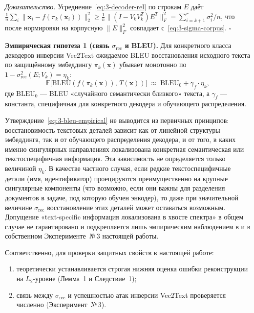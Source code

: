 \documentclass[a4paper, 12pt, oneside, openany]{article}
\begin{document}
\emph{Доказательство.} Усреднение~\eqref{eq:3-decoder-rel} по строкам $E$ даёт $\frac{1}{n} \sum_i \| \mathbf{x}_i - f(\pi_k(\mathbf{x}_i)) \|_{2}^{2} \geq \frac{1}{n}\| (I - V_k V_k^{T}) E^{T}\|_F^2 = \sum_{i = k+1}^{r} \sigma_i^{2} / n$, что после нормировки на корпусную $\| E \|_F^2$ совпадает с~\eqref{eq:3-sigma-corpus}. $\square$

\textbf{Эмпирическая гипотеза 1 (связь $\sigma_{\mathrm{rec}}$ и BLEU).} Для конкретного класса декодеров инверсии Vec2Text \cite{ref5} ожидаемое BLEU восстановления исходного текста по защищённому эмбеддингу $\pi_k(\mathbf{x})$ убывает монотонно по $1 - \sigma_{\mathrm{rec}}^{2}(E; V_k) = \eta_k$:
\begin{equation}
	\mathbb{E}\!\bigl[\mathrm{BLEU}(f(\pi_k(\mathbf{x})),\, T(\mathbf{x}))\bigr] \;\approx\; \mathrm{BLEU}_{0} + \gamma_{\!f} \cdot \eta_k,
	\label{eq:3-bleu-empirical}
\end{equation}
где $\mathrm{BLEU}_{0}$ --- BLEU «случайного семантически близкого» текста, а $\gamma_{\!f}$ --- константа, специфичная для конкретного декодера и обучающего распределения.

Утверждение~\eqref{eq:3-bleu-empirical} не выводится из первичных принципов: восстановимость текстовых деталей зависит как от линейной структуры эмбеддинга, так и от обучающего распределения декодера, и от того, в каких именно сингулярных направлениях локализована конкретная семантическая или текстоспецифичная информация. Эта зависимость не определяется только величиной $\eta_k$. В качестве частного случая, если редкие текстоспецифичные детали (имя, идентификатор) проецируются преимущественно на крупные сингулярные компоненты (что возможно, если они важны для разделения документов в задаче, под которую обучен энкодер), то даже при значительной величине $\sigma_{\mathrm{rec}}$ восстановление этих деталей может оставаться возможным. Допущение «text-specific информация локализована в хвосте спектра» в общем случае не гарантировано и подкрепляется лишь эмпирическим наблюдением в \cite{ref69} и в собственном Эксперименте~№\,3 настоящей работы.

Соответственно, для проверки защитных свойств в настоящей работе:
\begin{enumerate}
 \item теоретически устанавливается строгая нижняя оценка ошибки реконструкции на $L_2$-уровне (Лемма~1 и Следствие~1); 
 
 \item связь между $\sigma_{\mathrm{rec}}$ и успешностью атак инверсии Vec2Text проверяется численно (Эксперимент~№\,3).
\end{enumerate}
\end{document}
